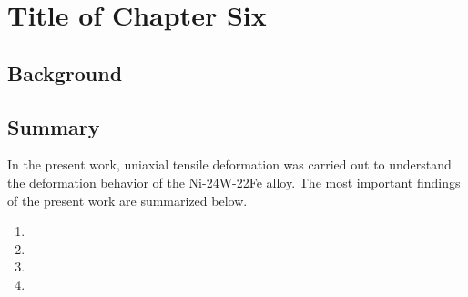 
\chapter{Title of Chapter Six}

\label{Chapter6}


\lipsum[1-2]

\section{Background}

\lipsum[1-2]



\section{Summary}
In the present work, uniaxial tensile deformation was carried out to understand the deformation behavior of the Ni-24W-22Fe alloy. The most important findings of the present work are summarized below.
\begin{enumerate}
    \item \lipsum[1]
    
    \item \lipsum[1]
  
    \item \lipsum[1]
    
    \item \lipsum[1]
    
\end{enumerate}

